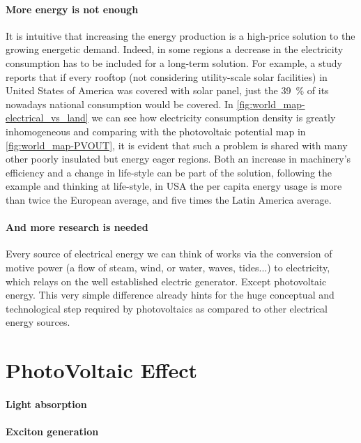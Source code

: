\paragraph{More energy is not enough} It is intuitive that increasing the energy production is a high-price solution to the growing energetic demand.
Indeed, in some regions a decrease in the electricity consumption has to be included for a long-term solution.
For example, a study\cite{Margolis2016} reports that if every rooftop (not considering utility-scale solar facilities) in United States of America was covered with solar panel, just the 39~\% of its nowadays national consumption would be covered.
In \cref{fig:world_map-electrical_vs_land} we can see how electricity consumption density is greatly inhomogeneous and comparing with the photovoltaic potential map in \cref{fig:world_map-PVOUT}, it is evident that such a problem is shared with many other poorly insulated but energy eager regions.
Both an increase in machinery's efficiency and a change in life-style can be part of the solution, following the example and thinking at life-style, in USA the per capita energy usage is more than twice the European average, and five times the Latin America average.\cite{IEA}

\paragraph{And more research is needed} Every source of electrical energy we can think of works via the conversion of motive power (a flow of steam, wind, or water, waves, tides...) to electricity, which relays on the well established electric generator. Except photovoltaic energy. This very simple difference already hints for the huge conceptual and technological step required by photovoltaics as compared to other electrical energy sources.


\section{PhotoVoltaic Effect}

\paragraph{Light absorption}

\paragraph{Exciton generation}

